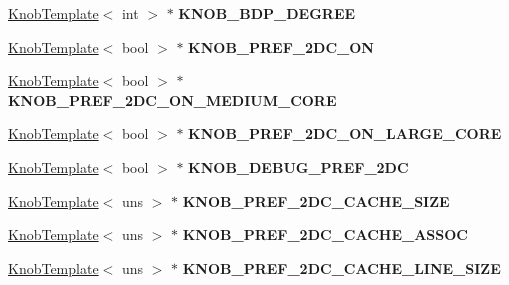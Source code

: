 \begin{DoxyCompactItemize}
\item 
\hypertarget{classall__knobs__c_a6ca5015e972760961094ebe00f3a194c}{
\hyperlink{classKnobTemplate}{KnobTemplate}$<$ int $>$ $\ast$ {\bfseries KNOB\_\-BDP\_\-DEGREE}}
\label{classall__knobs__c_a6ca5015e972760961094ebe00f3a194c}

\item 
\hypertarget{classall__knobs__c_ae428ef8906c0accdc9caefed001f6cac}{
\hyperlink{classKnobTemplate}{KnobTemplate}$<$ bool $>$ $\ast$ {\bfseries KNOB\_\-PREF\_\-2DC\_\-ON}}
\label{classall__knobs__c_ae428ef8906c0accdc9caefed001f6cac}

\item 
\hypertarget{classall__knobs__c_a5a2e3d79742d0ff825558e121f54a789}{
\hyperlink{classKnobTemplate}{KnobTemplate}$<$ bool $>$ $\ast$ {\bfseries KNOB\_\-PREF\_\-2DC\_\-ON\_\-MEDIUM\_\-CORE}}
\label{classall__knobs__c_a5a2e3d79742d0ff825558e121f54a789}

\item 
\hypertarget{classall__knobs__c_af91b89eba98a9a84345ee54bfa34bf76}{
\hyperlink{classKnobTemplate}{KnobTemplate}$<$ bool $>$ $\ast$ {\bfseries KNOB\_\-PREF\_\-2DC\_\-ON\_\-LARGE\_\-CORE}}
\label{classall__knobs__c_af91b89eba98a9a84345ee54bfa34bf76}

\item 
\hypertarget{classall__knobs__c_ad8b88fb15d8c517f1d027ad98a58c9a7}{
\hyperlink{classKnobTemplate}{KnobTemplate}$<$ bool $>$ $\ast$ {\bfseries KNOB\_\-DEBUG\_\-PREF\_\-2DC}}
\label{classall__knobs__c_ad8b88fb15d8c517f1d027ad98a58c9a7}

\item 
\hypertarget{classall__knobs__c_a66d05cb76df3460125094da6d74c54e6}{
\hyperlink{classKnobTemplate}{KnobTemplate}$<$ uns $>$ $\ast$ {\bfseries KNOB\_\-PREF\_\-2DC\_\-CACHE\_\-SIZE}}
\label{classall__knobs__c_a66d05cb76df3460125094da6d74c54e6}

\item 
\hypertarget{classall__knobs__c_ac4a116605c15d6fd7ae83705a0f42b04}{
\hyperlink{classKnobTemplate}{KnobTemplate}$<$ uns $>$ $\ast$ {\bfseries KNOB\_\-PREF\_\-2DC\_\-CACHE\_\-ASSOC}}
\label{classall__knobs__c_ac4a116605c15d6fd7ae83705a0f42b04}

\item 
\hypertarget{classall__knobs__c_a15676da598142f6d16b42e8eadf5335d}{
\hyperlink{classKnobTemplate}{KnobTemplate}$<$ uns $>$ $\ast$ {\bfseries KNOB\_\-PREF\_\-2DC\_\-CACHE\_\-LINE\_\-SIZE}}
\label{classall__knobs__c_a15676da598142f6d16b42e8eadf5335d}


\end{DoxyCompactItemize}
